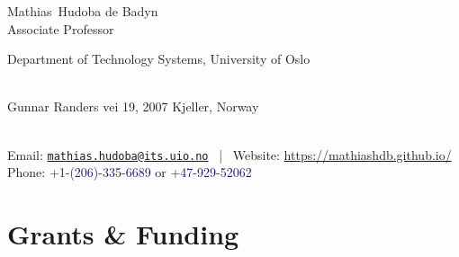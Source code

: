 \documentclass[11pt, letterpaper]{article}
\makeatletter
\newcommand{\FirstName}{Mathias}
\newcommand{\LastName}{Hudoba de Badyn}
\newcommand{\MyName}{\FirstName\ \LastName}
\newcommand{\MyRole}{Associate Professor}
\newcommand{\Email}{mathias.hudoba@its.uio.no}
\newcommand{\Website}{https://mathiashdb.github.io/}
\newcommand{\PhoneUS}{+1-(206)-335-6689}
\newcommand{\PhoneEU}{+47-929-52062}
\newcommand{\Affiliation}{
  Department of Technology Systems, University of Oslo
}
\newcommand{\Address}{
    Gunnar Randers vei 19, 2007 Kjeller, Norway
}
\newcommand{\makefield}[2]{\makebox[1.5em]{\color{MarkerColour!80!black}#1} #2}
\makeatother
\begin{document}
\nocite{*}

\thispagestyle{empty}

\begin{center}
    {\fontsize{16pt}{0}\selectfont \MyName}
    \\[0.5cm]
    {\fontsize{12pt}{0}\selectfont \MyRole}
    \\[0.3cm]
    {\fontsize{10pt}{0}\selectfont
        \Affiliation
        \\[0.2cm]
        \Address
        \\[0.08cm]
        Email: \href{mailto:\Email}{\texttt{\Email}}
        \, | \,
        Website: \url{\Website}
        \\Phone: \textcolor{MidnightBlue}{\PhoneUS} or \textcolor{MidnightBlue}{\PhoneEU}
    }
\end{center}





\newpage
{}
  \section*{Grants \& Funding}
  
  \restoregeometry
\newpage

\newpage






\newpage


%
%
\end{document}
